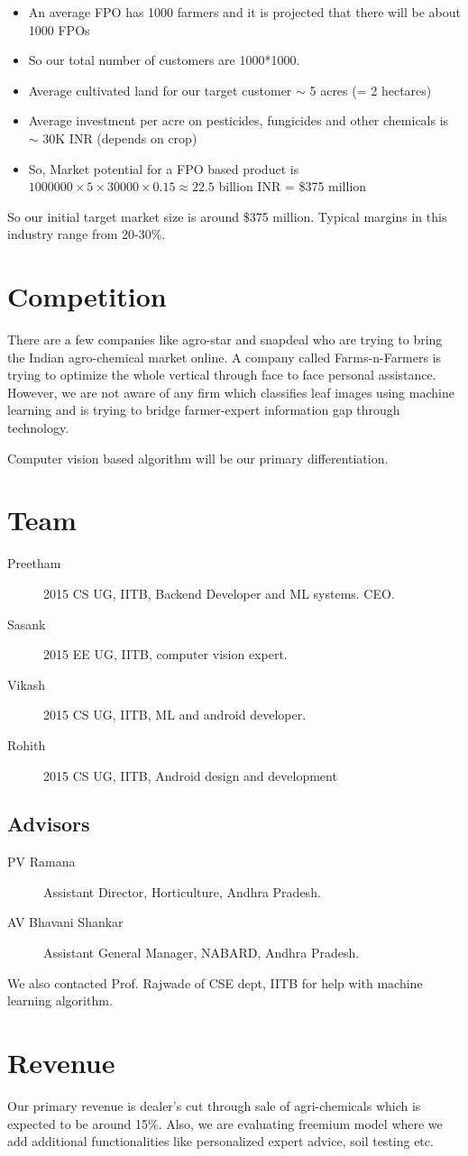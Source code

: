\documentclass[a4paper]{article}
\begin{document}
\begin{itemize}
\item[] An average FPO has 1000 farmers and it is projected that there will be about 1000 FPOs
\item[] So our total number of customers are 1000*1000.
\item[] Average cultivated land for our target customer $\sim$  5 acres (= 2 hectares)
\item[] Average investment per acre on pesticides, fungicides and other chemicals is $\sim$ 30K INR (depends on crop)
\item[] So, Market potential for a FPO based product is $1000000 \times 5 \times 30000 \times 0.15 \approx 22.5$ billion INR = \$375 million
\end{itemize}

So our initial target market size is around \$375 million. Typical margins in this industry range from 20-30\%.

\section{Competition}
There are a few companies like agro-star and snapdeal who are trying to bring the Indian agro-chemical market online. 
A company called Farms-n-Farmers is trying to optimize the whole vertical through face to face personal assistance. 
However, we are not aware of any firm which classifies leaf images using machine learning and is trying to bridge farmer-expert information gap through technology.

Computer vision based algorithm will be our primary differentiation.


\section{Team}

\begin{description}
\item[Preetham] 2015 CS UG, IITB, Backend Developer and ML systems. CEO. 
\item[Sasank] 2015 EE UG, IITB, computer vision expert.
\item[Vikash] 2015 CS UG, IITB, ML and android developer.
\item[Rohith] 2015 CS UG, IITB, Android design and development
\end{description}

\subsection{Advisors}
\begin{description}
\item[PV Ramana] Assistant Director, Horticulture, Andhra Pradesh.
\item[AV Bhavani Shankar] Assistant General Manager, NABARD, Andhra Pradesh.
\end{description}
We also contacted Prof. Rajwade of CSE dept, IITB for help with machine learning algorithm.

\section{Revenue}
Our primary revenue is dealer's cut through sale of agri-chemicals which is expected to be around 15\%. Also, we are evaluating freemium model where we add additional functionalities like personalized expert advice, soil testing etc.
\end{document}
